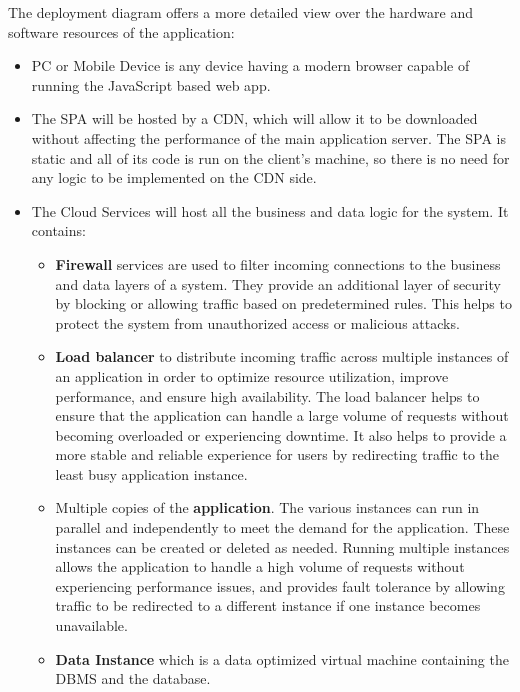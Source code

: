 The deployment diagram offers a more detailed view over the hardware and software resources of the application:
\begin{itemize}
    \item PC or Mobile Device is any device having a modern browser capable of running the JavaScript based web app.
    \item The SPA will be hosted by a CDN, which will allow it to be downloaded without affecting the performance of the main application server. The SPA is static and all of its code is run on the client's machine, so there is no need for any logic to be implemented on the CDN side.
    \item The Cloud Services will host all the business and data logic for the system. It contains:
          \begin{itemize}
              \item \textbf{Firewall} services are used to filter incoming connections to the business and data layers of a system. They provide an additional layer of security by blocking or allowing traffic based on predetermined rules. This helps to protect the system from unauthorized access or malicious attacks.
              \item \textbf{Load balancer} to distribute incoming traffic across multiple instances of an application in order to optimize resource utilization, improve performance, and ensure high availability. The load balancer helps to ensure that the application can handle a large volume of requests without becoming overloaded or experiencing downtime. It also helps to provide a more stable and reliable experience for users by redirecting traffic to the least busy application instance.
              \item Multiple copies of the \textbf{application}. The various instances can run in parallel and independently to meet the demand for the application. These instances can be created or deleted as needed. Running multiple instances allows the application to handle a high volume of requests without experiencing performance issues, and provides fault tolerance by allowing traffic to be redirected to a different instance if one instance becomes unavailable.
              \item \textbf{Data Instance} which is a data optimized virtual machine containing the DBMS and the database.
          \end{itemize}
\end{itemize}



